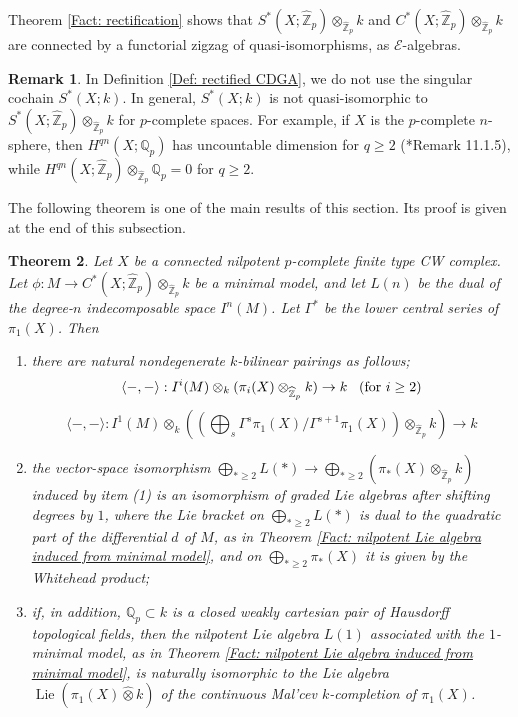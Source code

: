 \documentclass[11pt]{amsart}
\newtheorem{theorem}{Theorem}[section]
\theoremstyle{definition}
\newtheorem{remark}[theorem]{Remark}
\numberwithin{equation}{section}
\numberwithin{equation}{section}
\newcommand\QQ{\mathbb{Q}}
\newcommand\ZZ{\mathbb{Z}}
\DeclareMathOperator{\Lie}{Lie}
\begin{document}
Theorem \ref{Fact: rectification} shows that $S^*(X;\widehat{\ZZ}_p)\otimes_{\widehat{\ZZ}_p} k$ and $
C^{*}(X;\widehat{\ZZ}_{p})\otimes_{\widehat{\ZZ}_{p}} k
$ are connected by a functorial zigzag of quasi-isomorphisms, as $\mathcal{E}$-algebras. 

\begin{remark}
In Definition \ref{Def: rectified CDGA}, we do not use the singular cochain $S^*(X;k)$. In general, $S^*(X;k)$ is not quasi-isomorphic to $S^*(X;\widehat{\ZZ}_p)\otimes_{\widehat{\ZZ}_p} k$ for $p$-complete spaces. For example, if $X$ is the $p$-complete $n$-sphere, then $H^{qn}(X;\QQ_p)$ has uncountable dimension for $q\geq 2$ (\cite{more-concise}*{Remark 11.1.5}), while $H^{qn}(X;\widehat{\ZZ}_p)\otimes_{\widehat{\ZZ}_p}\QQ_p=0$ for $q\geq 2$.
\end{remark}

The following theorem is one of the main results of this section. Its proof is given at the end of this subsection.

\begin{theorem}\label{Thm: minimal model computes rational homotopy groups}
Let $X$ be a connected nilpotent $p$-complete finite type CW complex. Let $\phi:M\rightarrow C^*(X;\widehat{\ZZ}_p)\otimes_{\widehat{\ZZ}_p} k$ be a minimal model, and let $L(n)$ be the dual of the degree-$n$ indecomposable space $I^n(M)$. Let $\Gamma^*$ be the lower central series of $\pi_1(X)$. Then
\begin{enumerate}[leftmargin=0.25in]
    \item there are natural nondegenerate $k$-bilinear pairings as follows;
    \[
\langle -,- \rangle: I^i(M)\otimes_{k} (\pi_i(X)\otimes_{\widehat{\ZZ}_p} k) \rightarrow k \text{\,\,\, (for $i\geq 2$)}
\]
\[
\langle -,- \rangle: I^1(M)\otimes_{k} ((\bigoplus_s \Gamma^s\pi_1(X)/\Gamma^{s+1}\pi_1(X))\otimes_{\widehat{\ZZ}_p} k) \rightarrow k
\]
    \item the vector-space isomorphism $\bigoplus_{*\geq 2} L(*)\rightarrow \bigoplus_{*\geq 2}(\pi_{*}(X)\otimes_{\widehat{\ZZ}_p} k)$ induced by item (1) is an isomorphism of graded Lie algebras after shifting degrees by $1$, where the Lie bracket on $\bigoplus_{*\geq 2}L(*)$ is dual to the quadratic part of the differential $d$ of $M$, as in Theorem \ref{Fact: nilpotent Lie algebra induced from minimal model}, and on $\bigoplus_{*\geq 2}\pi_{*}(X)$ it is given by the Whitehead product;
    \item if, in addition, $\QQ_p\subset k$ is a closed weakly cartesian pair of Hausdorff topological fields, then the nilpotent Lie algebra $L(1)$ associated with the $1$-minimal model, as in Theorem \ref{Fact: nilpotent Lie algebra induced from minimal model}, is naturally isomorphic to the Lie algebra $\Lie(\pi_1(X)\widehat{\otimes} k)$ of the continuous Mal'cev $k$-completion of $\pi_1(X)$.
\end{enumerate}
\end{theorem}
\end{document}
